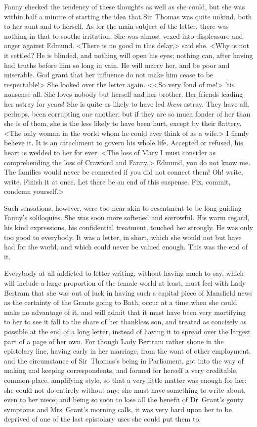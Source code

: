 Fanny checked the tendency of these thoughts as well as she could, but she was within half a minute of starting the idea that Sir~Thomas was quite unkind, both to her aunt and to herself. As for the main subject of the letter, there was nothing in that to soothe irritation. She was almost vexed into displeasure and anger against Edmund. <There is no good in this delay,> said she. <Why is not it settled? He is blinded, and nothing will open his eyes; nothing can, after having had truths before him so long in vain. He will marry her, and be poor and miserable. God grant that her influence do not make him cease to be respectable!> She looked over the letter again. <<So very fond of me!>  'tis nonsense all. She loves nobody but herself and her brother. Her friends leading her astray for years! She is quite as likely to have led \textit{them}  astray. They have all, perhaps, been corrupting one another; but if they are so much fonder of her than she is of them, she is the less likely to have been hurt, except by their flattery. <The only woman in the world whom he could ever think of as a wife.> I firmly believe it. It is an attachment to govern his whole life. Accepted or refused, his heart is wedded to her for ever. <The loss of Mary I must consider as comprehending the loss of Crawford and Fanny.> Edmund, you do not know me. The families would never be connected if you did not connect them! Oh! write, write. Finish it at once. Let there be an end of this suspense. Fix, commit, condemn yourself.>

Such sensations, however, were too near akin to resentment to be long guiding Fanny's soliloquies. She was soon more softened and sorrowful. His warm regard, his kind expressions, his confidential treatment, touched her strongly. He was only too good to everybody. It was a letter, in short, which she would not but have had for the world, and which could never be valued enough. This was the end of it.

Everybody at all addicted to letter-writing, without having much to say, which will include a large proportion of the female world at least, must feel with Lady Bertram that she was out of luck in having such a capital piece of Mansfield news as the certainty of the Grants going to Bath, occur at a time when she could make no advantage of it, and will admit that it must have been very mortifying to her to see it fall to the share of her thankless son, and treated as concisely as possible at the end of a long letter, instead of having it to spread over the largest part of a page of her own. For though Lady Bertram rather shone in the epistolary line, having early in her marriage, from the want of other employment, and the circumstance of Sir~Thomas's being in Parliament, got into the way of making and keeping correspondents, and formed for herself a very creditable, common-place, amplifying style, so that a very little matter was enough for her: she could not do entirely without any; she must have something to write about, even to her niece; and being so soon to lose all the benefit of Dr~Grant's gouty symptoms and Mrs~Grant's morning calls, it was very hard upon her to be deprived of one of the last epistolary uses she could put them to.

